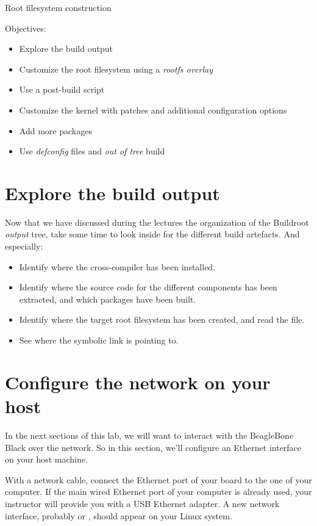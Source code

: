 \subchapter
{Root filesystem construction}
{Objectives:
  \begin{itemize}
  \item Explore the build output
  \item Customize the root filesystem using a {\em rootfs overlay}
  \item Use a post-build script
  \item Customize the kernel with patches and additional configuration
    options
  \item Add more packages
  \item Use {\em defconfig} files and {\em out of tree} build
  \end{itemize}
}

\section{Explore the build output}

Now that we have discussed during the lectures the organization of the
Buildroot {\em output} tree, take some time to look inside
 for the different build artefacts. And especially:

\begin{itemize}

\item Identify where the cross-compiler has been installed.

\item Identify where the source code for the different components has
  been extracted, and which packages have been built.

\item Identify where the target root filesystem has been created, and
  read the  file.

\item See where the  symbolic link is pointing to.

\end{itemize}

\section{Configure the network on your host}

In the next sections of this lab, we will want to interact with the
BeagleBone Black over the network. So in this section, we'll configure
an Ethernet interface on your host machine.

With a network cable, connect the Ethernet port of your board to the
one of your computer. If the main wired Ethernet port of your computer
is already used, your instructor will provide you with a USB Ethernet
adapter. A new network interface, probably  or ,
should appear on your Linux system.

